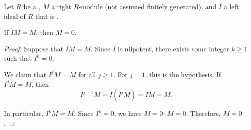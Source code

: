 \begin{lemma}  \label{lemma:nakayamas_lemma_for_finitely_generated_modules_over_a_ring_with_nilpotent_ideal}
	Let $R$ be a , $M$ a right $R$-module (not assumed finitely generated), and $I$ a left ideal of $R$ that is .

	If $IM = M$, then $M = 0$.
\end{lemma}
\begin{proof}
	Suppose that $IM = M$. Since $I$ is nilpotent, there exists some integer $k \geq 1$ such that $I^k = 0$.

	We claim that $I^j M = M$ for all $j \geq 1$. For $j = 1$, this is the hypothesis. If $I^j M = M$, then
	$$I^{j+1} M = I(I^j M) = IM = M.$$

	In particular, $I^k M = M$. Since $I^k = 0$, we have $M = 0 \cdot M = 0$. Therefore, $M = 0$.
\end{proof}
